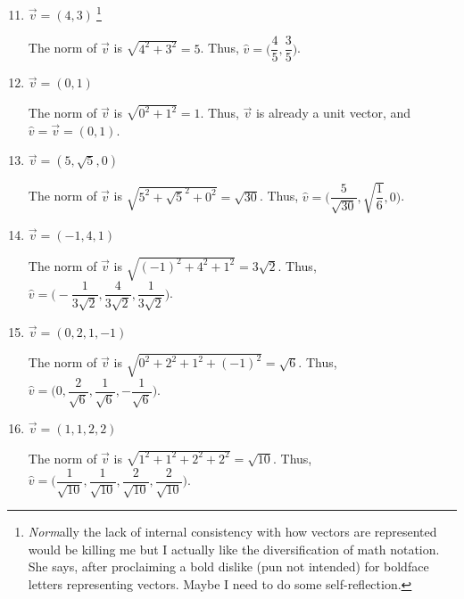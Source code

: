 \documentclass{article}
\begin{document}
\begin{enumerate}
    \setcounter{enumi}{10} 
    \item \(\overrightarrow{v} = (4,3)~\)\footnote{\textit{Norm}ally the lack of internal consistency with how vectors are represented would be killing me but I actually like the diversification of math notation. She says, after proclaiming a bold dislike (pun not intended)
    for boldface letters representing vectors. Maybe I need to do some self-reflection.}\begin{solution}
        The norm of \(\overrightarrow{v}\) is \(\sqrt{4^2 + 3^2} = 5\). Thus, \(\hat{v} = \biggl(\dfrac{4}{5}, \dfrac{3}{5}\biggl)\). 
    \end{solution}
    \item \(\overrightarrow{v} = (0,1)\)\begin{solution}
        The norm of \(\overrightarrow{v}\) is \(\sqrt{0^2 + 1^2} = 1\). Thus, \(\overrightarrow{v}\) is already a unit vector, and \(\hat{v} = \overrightarrow{v} = (0,1)\). 
    \end{solution}
    \item \(\overrightarrow{v} = (5,\sqrt{5},0)\)\begin{solution}
        The norm of \(\overrightarrow{v}\) is \(\sqrt{5^2 + {\sqrt{5}}^2 + 0^2} = \sqrt{30}\). Thus, \(\hat{v} = \biggl(\dfrac{5}{\sqrt{30}}, \sqrt{\dfrac{1}{6}}, 0\biggl)\). 
    \end{solution}
    \item \(\overrightarrow{v} = (-1,4,1)\)\begin{solution}
        The norm of \(\overrightarrow{v}\) is \(\sqrt{{(-1)}^2 + 4^2+ 1^2} = 3\sqrt{2}\). Thus, \(\hat{v} = \biggl(-\dfrac{1}{3\sqrt{2}}, \dfrac{4}{3\sqrt{2}}, \dfrac{1}{3\sqrt{2}}\biggl)\). 
    \end{solution}
    \item \(\overrightarrow{v} = (0,2,1,-1)\)\begin{solution}
        The norm of \(\overrightarrow{v}\) is \(\sqrt{0^2 + 2^2 + 1^2 + {(-1)}^2} = \sqrt{6}\). Thus, \(\hat{v} = \biggl(0, \dfrac{2}{\sqrt{6}}, \dfrac{1}{\sqrt{6}}, -\dfrac{1}{\sqrt{6}}\biggl)\). 
    \end{solution}
    \item \(\overrightarrow{v} = (1,1,2,2)\)\begin{solution}
        The norm of \(\overrightarrow{v}\) is \(\sqrt{1^2 + 1^2 + 2^2 + 2^2} = \sqrt{10}\). Thus, \(\hat{v} = \biggl(\dfrac{1}{\sqrt{10}}, \dfrac{1}{\sqrt{10}}, \dfrac{2}{\sqrt{10}}, \dfrac{2}{\sqrt{10}}\biggl)\).
    \end{solution}
\end{enumerate}
\end{document}

